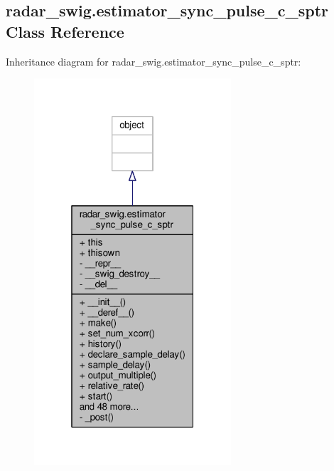 \subsection{radar\+\_\+swig.\+estimator\+\_\+sync\+\_\+pulse\+\_\+c\+\_\+sptr Class Reference}
\label{classradar__swig_1_1estimator__sync__pulse__c__sptr}


Inheritance diagram for radar\+\_\+swig.\+estimator\+\_\+sync\+\_\+pulse\+\_\+c\+\_\+sptr\+:
\nopagebreak
\begin{figure}[H]
\begin{center}
\leavevmode
\includegraphics[width=208pt]{d0/d2d/classradar__swig_1_1estimator__sync__pulse__c__sptr__inherit__graph}
\end{center}
\end{figure}


